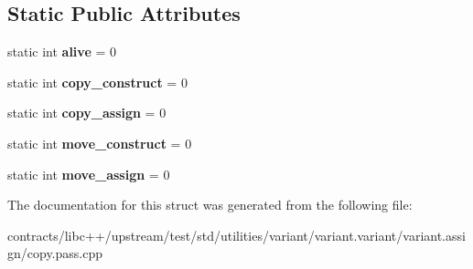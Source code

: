 \subsection*{Static Public Attributes}
\begin{DoxyCompactItemize}
\item 
\mbox{\label{struct_copy_assign_a783d2de1e2cf390086e674c2e6449480}} 
static int {\bfseries alive} = 0
\item 
\mbox{\label{struct_copy_assign_af48e9c9a2b79db4c9ce5e0ea2211fcc0}} 
static int {\bfseries copy\+\_\+construct} = 0
\item 
\mbox{\label{struct_copy_assign_ab513812f6edd1c2dee0a1cff98967e4f}} 
static int {\bfseries copy\+\_\+assign} = 0
\item 
\mbox{\label{struct_copy_assign_abeb27ca6e9d47f4aa8f29af7a828e7b6}} 
static int {\bfseries move\+\_\+construct} = 0
\item 
\mbox{\label{struct_copy_assign_a4db57700b655c3f91beff1f87879a821}} 
static int {\bfseries move\+\_\+assign} = 0
\end{DoxyCompactItemize}


The documentation for this struct was generated from the following file\+:\begin{DoxyCompactItemize}
\item 
contracts/libc++/upstream/test/std/utilities/variant/variant.\+variant/variant.\+assign/copy.\+pass.\+cpp\end{DoxyCompactItemize}
